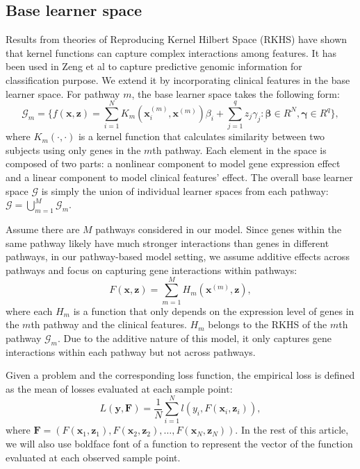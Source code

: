 \documentclass[a4paper,12pt]{article}
\newcommand{\bd}[1]{\mathbf{#1}}
\newcommand{\pathexpr}[3]{{#1}_{#2}^{(#3)}}
\begin{document}
	\subsection{Base learner space}
	Results from theories of Reproducing Kernel Hilbert Space (RKHS)\citep{friedman2001elements} have shown that kernel functions can capture complex interactions among features. It has been used in Zeng et al\citep{zeng2019pathway} to capture predictive genomic information for classification purpose. We extend it by incorporating clinical features in the base learner space. For pathway $m$, the base learner space takes the following form:
	\begin{equation}
	\label{eqn:G}
	\mathcal{G}_m = \{  f(\bd{x}, \bd{z}) = \sum_{i=1}^N K_m(\pathexpr{\bd{x}}{i}{m}, \pathexpr{\bd{x} }{}{m}) \beta_i + \sum_{j=1}^q z_j \gamma_j : \mathbf{\beta} \in R^{N}, \mathbf{\gamma} \in R^{q} \},
	\end{equation}
	where $K_m(\cdot,\cdot)$ is a kernel function that calculates similarity between two subjects using only genes in the $m$th pathway. Each element in the space is composed of two parts: a nonlinear component to model gene expression effect and a linear component to model clinical features' effect. The overall base learner space $\mathcal{G}$ is simply the union of individual learner spaces from each pathway: $\mathcal{G} = \bigcup_{m=1}^M\mathcal{G}_m$.
	
	Assume there are $M$ pathways considered in our model. Since genes within the same pathway likely have much stronger interactions than genes in different pathways, in our pathway-based model setting, we assume additive effects across pathways and focus on capturing gene interactions within pathways:
	\begin{equation*}
	F(\bd{x}, \bd{z}) = \sum_{m=1}^M H_m(\bd{x}^{(m)}, \bd{z}),
	\end{equation*}
	where each $H_m$ is a function that only depends on the expression level of genes in the $m$th pathway and the clinical features. $H_m$ belongs to the RKHS of the $m$th pathway $\mathcal{G}_m $. Due to the additive nature of this model, it only captures gene interactions within each pathway but not across pathways. 
	
	Given a problem and the corresponding loss function, the empirical loss is defined as the mean of losses evaluated at each sample point:
	$$L(\bd{y},\bd{F}) = \frac{1}{N} \sum_{i=1}^N l(y_i,F(\bd{x}_i,\bd{z}_i)),$$
	where $\bd{F} = (F(\bd{x}_1, \bd{z}_1), F(\bd{x}_2, \bd{z}_2), \ldots, F(\bd{x}_N, \bd{z}_N))$. In the rest of this article, we will also use boldface font of a function to represent the vector of the function evaluated at each observed sample point.
	
\end{document}
